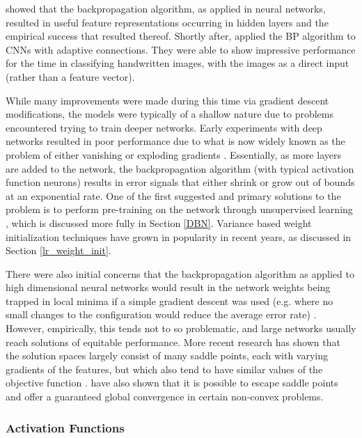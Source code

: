 \documentclass[a4paper,11pt,oneside]{article}
\theoremstyle{plain}
\theoremstyle{definition}
\begin{document}
	\citet{Rumelhart} showed that the backpropagation algorithm, as applied in neural networks, resulted in useful feature representations 
	occurring in hidden layers and the empirical success that resulted thereof.  
	Shortly after, \citet{LeCun3} applied the BP algorithm to CNNs with adaptive connections. They were able to show 
	impressive performance for the time in classifying handwritten images, with the images as a direct input (rather than a feature vector).
	\hfill \break 
	
	While many improvements were made during this time via gradient descent modifications, the 
	models were typically of a shallow nature due to problems encountered trying to train deeper networks. 
	Early experiments with deep networks resulted in poor performance due to what is now widely known as the problem 
	of either vanishing or exploding gradients \citep{Pascanu}. Essentially, as more layers are added to the network, the backpropagation 
	algorithm (with typical activation function neurons) results in error signals that either shrink or grow out of bounds at an 
	exponential rate. One of the first suggested and primary solutions to the problem is to perform pre-training on the 
	network through unsupervised learning  \citep{Schmidhuber}, which is discussed more fully in Section \ref{DBN}. Variance based 
	weight initialization techniques have grown in popularity in recent years, as discussed in Section \ref{lr_weight_init}.
	\hfill \break 
	
	There were also initial concerns that the backpropagation algorithm as applied to high dimensional neural networks would result 
	in the network weights being trapped in local minima if a simple gradient descent was used (e.g. where no small 
	changes to the configuration would reduce the average error rate) \citep{LeCun4}. 
	However, empirically, this tends not to so problematic, and large networks usually reach solutions of equitable 
	performance. More recent research has shown that the solution spaces largely consist of many saddle points, each 
	with varying gradients of the features, but which also tend to have similar values of the objective function \citep{Dauphin}. 
	\citet{Ge} have also shown that it is possible to escape saddle points and offer a guaranteed global convergence 
	in certain non-convex problems.
	\hfill \break 
	
	\subsubsection{Activation Functions}\label{lr_activationfunctions}
	
\end{document}
